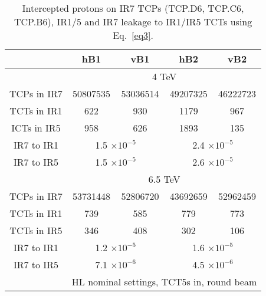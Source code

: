 \begin{table}
   \centering
   \caption{Intercepted protons on IR7 TCPs (\textsc{TCP.D6, TCP.C6, TCP.B6}), IR1/5 and IR7 leakage to IR1/IR5 TCTs using Eq.~\ref{eq3}.}

   \begin{tabular}{c|cc|cc}

       & hB1 & vB1 & hB2 & vB2\\ \hline       
       & \multicolumn{4}{c}{4 TeV} \\   %
       TCPs in IR7 & 50807535 & 53036514 & 49207325 & 46222723 \\
       TCTs in IR1 & 622 & 930 & 1179 & 967 \\
       ICTs in IR5 & 958 & 626 & 1893 & 135 \\ %
       IR7 to IR1  & \multicolumn{2}{c|}{1.5 $\times 10^{-5}$} & \multicolumn{2}{c}{2.4 $\times 10^{-5}$ } \\
       IR7 to IR5  & \multicolumn{2}{c|}{1.5 $\times 10^{-5}$} & \multicolumn{2}{c}{2.6 $\times 10^{-5}$ } \\
       \hline
       & \multicolumn{4}{c}{6.5 TeV} \\      
       TCPs in IR7 & 53731448 & 52806720 & 43692659 & 52962459 \\
       TCTs in IR1 & 739 & 585 & 779 & 773 \\
       TCTs in IR5 & 346 & 408 & 302 & 106 \\%
       IR7 to IR1 &  \multicolumn{2}{c|}{1.2 $\times 10^{-5}$} &  \multicolumn{2}{c}{1.6 $\times 10^{-5}$ } \\
       IR7 to IR5 &  \multicolumn{2}{c|}{7.1 $\times 10^{-6}$} &  \multicolumn{2}{c}{4.5 $\times 10^{-6}$ } \\
       \hline       
       & \multicolumn{4}{c}{HL nominal settings, TCT5s in, round beam}  \\ %
       

\end{tabular}
\end{table}
